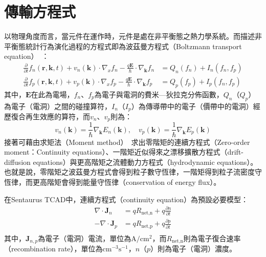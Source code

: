 \section{傳輸方程式}
以物理角度而言，當元件在運作時，元件是處在非平衡態之熱力學系統。而描述非平衡態統計行為演化過程的方程式即為波茲曼方程式（Boltzmann transport equation）~\cite{jungel2009transport}：
\begin{equation}
\label{eq:boltzmann-transport-equation}
\begin{aligned}
\frac{\partial}{\partial t}f_n(\mathbf{r},\mathbf{k},t)+v_n(\mathbf{k})\cdot\nabla_xf_n-\frac{q\mathbf{E}}{\hbar}\cdot\nabla_\mathbf{k}f_n&=Q_n(f_n)+I_n(f_n,f_p)\\[5pt]
\frac{\partial}{\partial t}f_p(\mathbf{r},\mathbf{k},t)+v_p(\mathbf{k})\cdot\nabla_xf_p-\frac{q\mathbf{E}}{\hbar}\cdot\nabla_\mathbf{k}f_p&=Q_p(f_p)+I_p(f_n,f_p)
\end{aligned}
\end{equation}
其中，$\mathbf{E}$在此為電場，$f_n$、$f_p$為電子與電洞的費米—狄拉克分佈函數，$Q_n$（$Q_p$）為電子（電洞）之間的碰撞算符，$I_n$（$I_p$）為傳導帶中的電子（價帶中的電洞）經歷復合再生效應的算符，而$v_n$、$v_p$則為：
\begin{equation}
v_n(\mathbf{k})=\frac{1}{\hbar}\nabla_\mathbf{k}E_n(\mathbf{k}),\quad v_p(\mathbf{k})=\frac{1}{\hbar}\nabla_\mathbf{k}E_p(\mathbf{k})
\end{equation}
\hspace{2em}接著可藉由求矩法（Moment method）~\cite{jungel2009transport}\cite{jacoboni2010theory}求出零階矩的連續方程式（Zero-order moment：Continuity equations）、一階矩近似得來之漂移擴散方程式（drift-diffusion equations）與更高階矩之流體動力方程式（hydrodynamic equations）。也就是說，零階矩之波茲曼方程式會得到粒子數守恆律，一階矩得到粒子流密度守恆律，而更高階矩會得到能量守恆律（conservation of energy flux）。

在Sentaurus TCAD中，連續方程式（continuity equation）為預設必要模型：
\begin{equation}
\begin{aligned}
\nabla\cdot\mathbf{J}_n&=qR_\text{net,n}+q\frac{\partial n}{\partial t}\\[5pt]
-\nabla\cdot\mathbf{J}_p&=qR_\text{net,p}+q\frac{\partial p}{\partial t}\\[5pt]
\end{aligned}
\end{equation}
其中，$\mathbf{J}_{n,p}$為電子（電洞）電流，單位為$\mathrm{A}/\mathrm{cm}^2$，而$R_\text{net,n}$則為電子復合速率（recombination rate），單位為$\mathrm{cm}^{-3}\mathrm{s}^{-1}$，$n$（$p$）則為電子（電洞）濃度。

